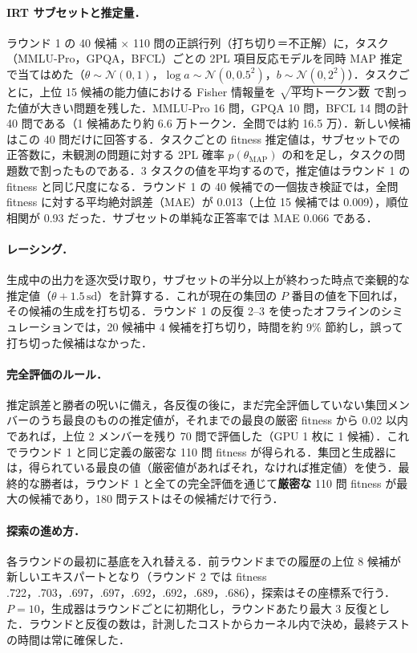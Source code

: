 \documentclass[uplatex,dvipdfmx,10pt,a4paper]{jsarticle}
\begin{document}
\paragraph{IRT サブセットと推定量．}ラウンド 1 の 40 候補 $\times$ 110 問の正誤行列（打ち切り＝不正解）に，タスク（MMLU-Pro，GPQA，BFCL）ごとの 2PL 項目反応モデルを同時 MAP 推定で当てはめた（$\theta\sim\mathcal N(0,1)$，$\log a\sim\mathcal N(0,0.5^2)$，$b\sim\mathcal N(0,2^2)$）．タスクごとに，上位 15 候補の能力値における Fisher 情報量を $\sqrt{\text{平均トークン数}}$ で割った値が大きい問題を残した．MMLU-Pro 16 問，GPQA 10 問，BFCL 14 問の計 40 問である（1 候補あたり約 6.6 万トークン．全問では約 16.5 万）．新しい候補はこの 40 問だけに回答する．タスクごとの fitness 推定値は，サブセットでの正答数に，未観測の問題に対する 2PL 確率 $p(\theta_{\text{MAP}})$ の和を足し，タスクの問題数で割ったものである．3 タスクの値を平均するので，推定値はラウンド 1 の fitness と同じ尺度になる．ラウンド 1 の 40 候補での一個抜き検証では，全問 fitness に対する平均絶対誤差（MAE）が 0.013（上位 15 候補では 0.009），順位相関が 0.93 だった．サブセットの単純な正答率では MAE 0.066 である．

\paragraph{レーシング．}生成中の出力を逐次受け取り，サブセットの半分以上が終わった時点で楽観的な推定値（$\theta+1.5\,\text{sd}$）を計算する．これが現在の集団の $P$ 番目の値を下回れば，その候補の生成を打ち切る．ラウンド 1 の反復 2--3 を使ったオフラインのシミュレーションでは，20 候補中 4 候補を打ち切り，時間を約 9\% 節約し，誤って打ち切った候補はなかった．

\paragraph{完全評価のルール．}推定誤差と勝者の呪いに備え，各反復の後に，まだ完全評価していない集団メンバーのうち最良のものの推定値が，それまでの最良の厳密 fitness から 0.02 以内であれば，上位 2 メンバーを残り 70 問で評価した（GPU 1 枚に 1 候補）．これでラウンド 1 と同じ定義の厳密な 110 問 fitness が得られる．集団と生成器には，得られている最良の値（厳密値があればそれ，なければ推定値）を使う．最終的な勝者は，ラウンド 1 と全ての完全評価を通じて\textbf{厳密な} 110 問 fitness が最大の候補であり，180 問テストはその候補だけで行う．

\paragraph{探索の進め方．}各ラウンドの最初に基底を入れ替える．前ラウンドまでの履歴の上位 8 候補が新しいエキスパートとなり（ラウンド 2 では fitness .722，.703，.697，.697，.692，.692，.689，.686），探索はその座標系で行う．$P=10$，生成器はラウンドごとに初期化し，ラウンドあたり最大 3 反復とした．ラウンドと反復の数は，計測したコストからカーネル内で決め，最終テストの時間は常に確保した．
\end{document}
